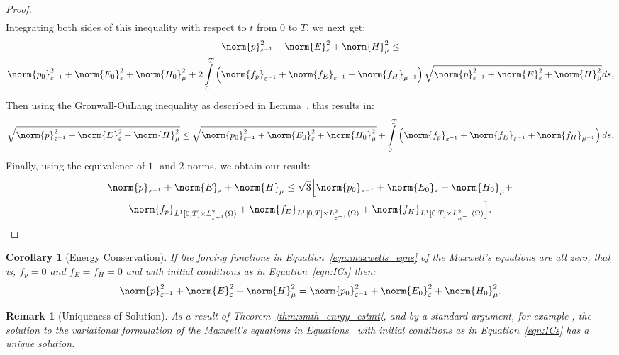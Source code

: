 \documentclass{amsart}
\theoremstyle{thmstyleone}%
\theoremstyle{thmstyletwo}%
\newtheorem{remark}{Remark}%
\theoremstyle{thmstylethree}%
\newtheorem{corollary}{Corollary}[theorem]
\begin{document}
\begin{proof}
\begin{align*}
\end{align*}
Integrating both sides of this inequality with respect to $t$ from $0$ to $T$, we next get:
\begin{multline*}
  \norm{p}^2_{\varepsilon^{-1}} + \norm{E}^2_{\varepsilon} + \norm{H}^2_{\mu} \le \\ \norm{p_0}^2_{\varepsilon^{-1}} + \norm{E_0}^2_{\varepsilon} + \norm{H_0}^2_{\mu} + 2 \int\limits_0^T \left( \norm{f_p}_{\varepsilon^{-1}} + \norm{f_E}_{\varepsilon^{-1}} + \norm{f_H}_{\mu^{-1}} \right) \sqrt{\norm{p}^2_{\varepsilon^{-1}} + \norm{E}^2_{\varepsilon} + \norm{H}^2_{\mu}} ds,
\end{multline*}
Then using the Gronwall-OuLang inequality as described in Lemma~, this results in:
\[
  \sqrt{\norm{p}^2_{\varepsilon^{-1}} + \norm{E}^2_{\varepsilon} + \norm{H}^2_{\mu}} \le \sqrt{\norm{p_0}^2_{\varepsilon^{-1}} + \norm{E_0}^2_{\varepsilon} + \norm{H_0}^2_{\mu}} + \int\limits_0^T \left(\norm{f_p}_{\varepsilon^{-1}} + \norm{f_E}_{\varepsilon^{-1}} + \norm{f_H}_{\mu^{-1}} \right) ds.
\]
Finally, using the equivalence of $1$- and $2$-norms, we obtain our result:
\begin{multline*}
  \norm{p}_{\varepsilon^{-1}} + \norm{E}_{\varepsilon} + \norm{H}_{\mu} \le 
  \sqrt{3} \Big[ \norm{p_0}_{\varepsilon^{-1}} + \norm{E_0}_{\varepsilon} + \norm{H_0}_{\mu} + \\
  \norm{f_p}_{L^1[0, T] \times L^2_{\varepsilon^{-1}}(\Omega)} + \norm{f_E}_{L^1[0, T] \times L^2_{\varepsilon^{-1}}(\Omega)} + \norm{f_H}_{L^1[0, T] \times L^2_{\mu^{-1}}(\Omega)} \Big]. \qedhere
\end{multline*}
\end{proof}

\begin{corollary}[Energy Conservation] \label{corr:smth_enrgy_cnsrvtn}
  If the forcing functions in Equation~\eqref{eqn:maxwells_eqns} of the Maxwell's equations are all zero, that is, $f_p = 0$ and $f_E = f_H = 0$ and with initial conditions as in Equation~\eqref{eqn:ICs} then:
  \[
    \norm{p}^2_{\varepsilon^{-1}} + \norm{E}^2_{\varepsilon} + \norm{H}^2_{\mu} = \norm{p_0}^2_{\varepsilon^{-1}} + \norm{E_0}^2_{\varepsilon} + \norm{H_0}^2_{\mu}.
  \]
\end{corollary}

\begin{remark}[Uniqueness of Solution]
As a result of Theorem~\ref{thm:smth_enrgy_estmt}, and by a standard argument, for example \cite[Theorem 5, Section 2.4, Chapter 2]{Evans2010}, the solution to the variational formulation of the Maxwell's equations in Equations~ with initial conditions as in Equation~\eqref{eqn:ICs} has a unique solution.
\end{remark}
\end{document}
